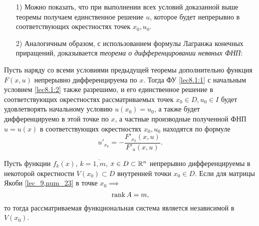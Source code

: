 \documentclass[../main.tex]{subfiles}
\begin{document}
\begin{rems}
	 \;
		 \begin{itemize}
		 	 \item[1)] Можно показать, что при выполнении всех условий 
		 	 доказанной выше теоремы получаем единственное решение $u$, 
		 	 которое будет непрерывно в соответствующих окрестностях точек 
		 	 $x_0, u_0$.

			 \item[2)] Аналогичным образом, с использованием формулы Лагранжа 
			 конечных приращений, доказывается \emph{теорема о 
			 дифференцировании неявных ФНП}:
		\end{itemize}
	\end{rems}
\begin{thm}
		Пусть наряду со всеми условиями предыдущей теоремы дополнительно 
		функция $F(x, u)$ непрерывно дифференцируема по $x$. Тогда ФУ 
		\eqref{lec8.1:1} с начальным условием \eqref{lec8.1:2} также разрешимо, 
		и его единственное решение в соответствующих окрестностях 
		рассматриваемых точек $x_0 \in D, u_0 \in I$ будет удовлетворять 
		начальному условию $u(x_0)=u_0$, а также будет дифференцируемо в 
		этой точке по $x$, а частные производные полученной ФНП $u = u(x)$ в 
		соответствующих окрестностях $x_0, u_0$ находятся по формуле
		\begin{equation}
			u'_{x_k} = -\frac{F'_{x_k}(x,u)}{F'_u(x,u)}. \label{lec8.1:6}
		\end{equation}
    \end{thm}
\begin{thm}
	Пусть функции $f_k\left(x\right)$, $k = \overline{1,m}$,
	$x \in D \subset \mathbb{R}^n$ непрерывно дифференцируемы в некоторой 
	окрестности $V(x_0) \subset D$ внутренней точки $x_0 \in D$. Если 
	для матрицы Якоби \eqref{lec_9,num_23} в точке $x_0 \implies$ 
	\begin{equation} \label{lec_10, num_24}
		\operatorname{rank} A = m,
	\end{equation}
 	то тогда рассматриваемая функциональная система 
 	является независимой в $V(x_0)$.
\end{thm}
\end{document}
